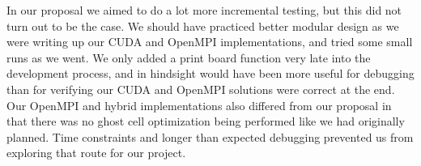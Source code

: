 \documentclass[11pt,twocolumn]{article}
\begin{document}
In our proposal we aimed to do a lot more incremental testing, but this did not turn out to be the case. We should have practiced better modular design as we were writing up our CUDA and OpenMPI implementations, and tried some small runs as we went. We only added a print board function very late into the development process, and in hindsight would have been more useful for debugging than for verifying our CUDA and OpenMPI solutions were correct at the end. Our OpenMPI and hybrid implementations also differed from our proposal in that there was no ghost cell optimization being performed like we had originally planned. Time constraints and longer than expected debugging prevented us from exploring that route for our project. 


\end{document}
